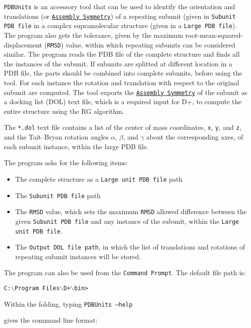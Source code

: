 \documentclass[../D+Manual.tex]{subfiles}
\begin{document}
\texttt{PDBUnits} is an accessory tool that can be used to identify the orientation and translations
(or \hyperref[chp:Symmetries]{\texttt{Assembly Symmetry}}) of a repeating subunit (given in \texttt{Subunit PDB file} in a complex supramolecular structure (given in a \texttt{Large PDB file}). The program also gets the tolerance, given by the maximum root-mean-squared-displacement (\texttt{RMSD})
value, within which repeating subunits can be considered similar. 
The program reads the PDB file of the complete structure and finds all the instances
of the subunit. If subunits are splitted at different location in a PDB file, the parts
should be combined into complete subunits, before using the tool. 
For each instance the
rotation and translation with respect to the original subunit are computed. The tool
exports the \hyperref[chp:Symmetries]{\texttt{Assembly Symmetry}} of the subunit as a docking list (DOL) text
file, which is a required input for D+, to compute the entire structure using
the RG algorithm\cite{RGs2016}. 

The \texttt{*.dol} text file contains a list of the center of mass coordinates, \texttt{x}, \texttt{y}, and \texttt{z}, and the Tait–Bryan rotation angles \texttt{$\alpha$}, \texttt{$\beta$}, and \texttt{$\gamma$} about the corresponding axes, of each subunit instance, within the large PDB file. 

The program asks for the following items:
\begin{itemize}
	\item The complete structure as a \texttt{Large unit PDB file} path
	\item The \texttt{Subunit PDB file} path
	\item The \texttt{RMSD} value, which sets the maximum \texttt{RMSD} allowed difference between the given \texttt{Subunit PDB file} and any instance of the subunit, within the \texttt{Large unit PDB file}.
	\item The \texttt{Output DOL file path}, in which the list of translations and rotations of repeating subunit instances will be stored.   
\end{itemize}

The program can also be used from the \texttt{Command Prompt}. The default file path is: 

\texttt{C:$\backslash$Program Files$\backslash$D+$\backslash$bin>}

Within the folding, typing 
\texttt{PDBUnits --help}

gives the command line format: 
	
\end{document}
